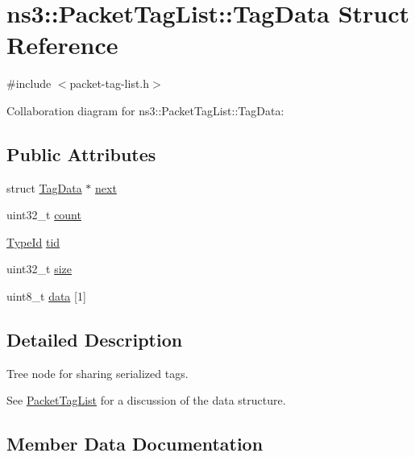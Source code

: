 \hypertarget{structns3_1_1PacketTagList_1_1TagData}{}\section{ns3\+:\+:Packet\+Tag\+List\+:\+:Tag\+Data Struct Reference}
\label{structns3_1_1PacketTagList_1_1TagData}


{\ttfamily \#include $<$packet-\/tag-\/list.\+h$>$}



Collaboration diagram for ns3\+:\+:Packet\+Tag\+List\+:\+:Tag\+Data\+:
\subsection*{Public Attributes}
\begin{DoxyCompactItemize}
\item 
struct \hyperlink{structns3_1_1PacketTagList_1_1TagData}{Tag\+Data} $\ast$ \hyperlink{structns3_1_1PacketTagList_1_1TagData_a9c4f438b752b46cdd695a68fca886822}{next}
\item 
uint32\+\_\+t \hyperlink{structns3_1_1PacketTagList_1_1TagData_a877d4257ceb116e1231c3d7e33131c98}{count}
\item 
\hyperlink{classns3_1_1TypeId}{Type\+Id} \hyperlink{structns3_1_1PacketTagList_1_1TagData_a5086e334de32e4eee36059907e5d2197}{tid}
\item 
uint32\+\_\+t \hyperlink{structns3_1_1PacketTagList_1_1TagData_a6d4ea1a09db8032900e037cfe938866f}{size}
\item 
uint8\+\_\+t \hyperlink{structns3_1_1PacketTagList_1_1TagData_adb4e85fe6e4a21a95c184b55ef9a8ff4}{data} \mbox{[}1\mbox{]}
\end{DoxyCompactItemize}


\subsection{Detailed Description}
Tree node for sharing serialized tags.

See \hyperlink{classns3_1_1PacketTagList}{Packet\+Tag\+List} for a discussion of the data structure. 

\subsection{Member Data Documentation}
